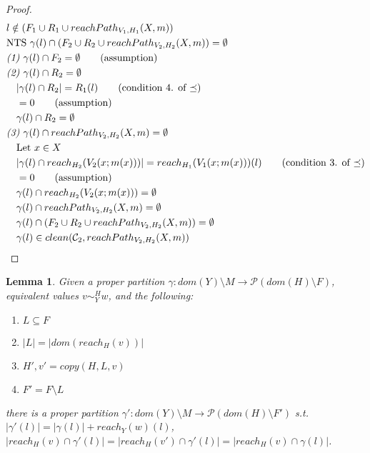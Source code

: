 \documentclass[11pt]{article}
\newcommand{\veq}[4]{#3 \sim^{#1}_{#2} #4}
\newtheorem{lemma}[theorem]{Lemma}
\theoremstyle{definition}
\begin{document}
\begin{proof}
\begin{align*}
		&l \notin (F_1 \cup R_1 \cup reachPath_{V_1,H_1}(X,m))\\
		&\text{NTS } \gamma(l) \cap (F_2 \cup R_2 \cup reachPath_{V_2,H_2}(X,m)) = \emptyset\\
		&\emph{(1) } \gamma(l) \cap F_2 = \emptyset \tag{assumption}\\
		&\emph{(2) } \gamma(l) \cap R_2 = \emptyset\\
		&\quad |\gamma(l) \cap R_2| = R_1(l) \tag{condition 4. of $\preceq$}\\ 
		&\quad = 0 \tag{assumption}\\
		&\quad \gamma(l) \cap R_2 = \emptyset\\
		&\emph{(3) } \gamma(l) \cap reachPath_{V_2,H_2}(X,m) = \emptyset\\
		&\quad \text{Let } x \in X\\
		&\quad |\gamma(l) \cap reach_{H_2}(V_2(x;m(x)))| = reach_{H_1}(V_1(x;m(x)))(l) 
			\tag{condition 3. of $\preceq$}\\
		&\quad = 0 \tag{assumption}\\
		&\quad\gamma(l) \cap reach_{H_2}(V_2(x;m(x))) = \emptyset\\
		&\quad\gamma(l) \cap reachPath_{V_2,H_2}(X,m) = \emptyset\\
		&\quad\gamma(l) \cap (F_2 \cup R_2 \cup reachPath_{V_2,H_2}(X,m)) = \emptyset\\
		&\quad\gamma(l) \in clean(\mathcal{C}_2,reachPath_{V_2,H_2}(X,m))
	\end{align*}
\end{proof}

\begin{lemma}\label{itm:copyRel}
	Given  a proper partition $\gamma : dom(Y) \setminus M \to \mathcal{P}(dom(H)\setminus F)$, 
	equivalent values $\veq{H}{Y}{v}{w}$, and the 
	following:
	\begin{enumerate}
		\item $L \subseteq F$
		\item $|L| = |dom(reach_H(v))|$
		\item $H',v' = copy(H,L,v)$
		\item $F' =	F \setminus L$
	\end{enumerate}
	there is a proper partition $\gamma' : dom(Y) \setminus M \to \mathcal{P}(dom(H) \setminus F')$ 
	s.t.
	$|\gamma'(l)| = |\gamma(l)| + reach_Y(w)(l)$, 
	$|reach_H(v) \cap \gamma'(l)| = |reach_H(v') \cap \gamma'(l)| = |reach_H(v) \cap \gamma(l)|$.
\end{lemma}
\end{document}
